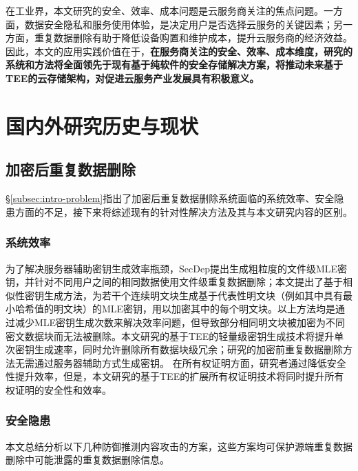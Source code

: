 在工业界，本文研究的安全、效率、成本问题是云服务商关注的焦点问题。一方面，数据安全隐私和服务使用体验，是决定用户是否选择云服务的关键因素；另一方面，重复数据删除有助于降低设备购置和维护成本，提升云服务商的经济效益。因此，本文的应用实践价值在于，\textbf{在服务商关注的安全、效率、成本维度，研究的系统和方法将全面领先于现有基于纯软件的安全存储解决方案，将推动未来基于TEE的云存储架构，对促进云服务产业发展具有积极意义。}

\section{国内外研究历史与现状}
\label{sec:compare}

\subsection{加密后重复数据删除}
\label{subsec:compare-deduplication}

\S\ref{subsec:intro-problem}指出了加密后重复数据删除系统面临的系统效率、安全隐患方面的不足，接下来将综述现有的针对性解决方法及其与本文研究内容的区别。

\subsubsection{系统效率}
\label{subsubsec:compare-deduplication-performance}

为了解决服务器辅助密钥生成效率瓶颈，SecDep\cite{zhou2015secdep}提出生成粗粒度的文件级MLE密钥，并针对不同用户之间的相同数据使用文件级重复数据删除；本文提出了基于相似性密钥生成方法\cite{qin17}，为若干个连续明文块生成基于代表性明文块（例如其中具有最小哈希值的明文块）的MLE密钥，用以加密其中的每个明文块。以上方法均是通过减少MLE密钥生成次数来解决效率问题，但导致部分相同明文块被加密为不同密文数据块而无法被删除。本文研究的基于TEE的轻量级密钥生成技术将提升单次密钥生成速率，同时允许删除所有数据块级冗余；研究的加密前重复数据删除方法无需通过服务器辅助方式生成密钥。
在所有权证明方面，研究者通过降低安全性提升效率\cite{xu2013weak,pietro12}，但是，本文研究的基于TEE的扩展所有权证明技术将同时提升所有权证明的安全性和效率。

\subsubsection{安全隐患}
\label{subsubsec:compare-deduplication-security}

本文总结分析以下几种防御推测内容攻击的方案，这些方案均可保护源端重复数据删除中可能泄露的重复数据删除信息。

